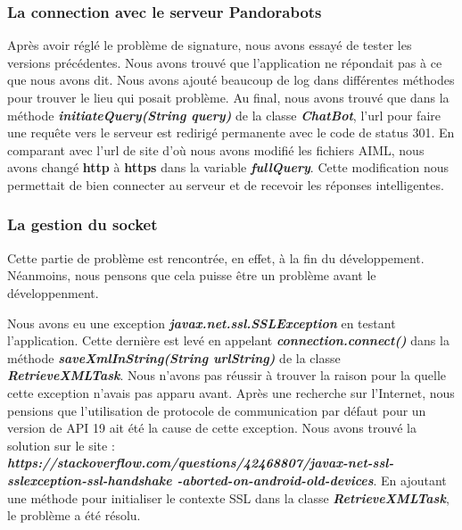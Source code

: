 \subsubsection{La connection avec le serveur Pandorabots}

\indent Après avoir réglé le problème de signature, nous avons essayé de tester les versions précédentes. Nous avons trouvé que l'application ne répondait pas à ce que nous avons dit. Nous avons ajouté beaucoup de log dans différentes méthodes pour trouver le lieu qui posait problème. Au final, nous avons trouvé que dans la méthode \textbf{\emph{initiateQuery(String query)}} de la classe \textbf{\emph{ChatBot}}, l'url pour faire une requête vers le serveur est redirigé permanente avec le code de status 301. En comparant avec l'url de site d'où nous avons modifié les fichiers AIML, nous avons changé \textbf{http} à \textbf{https} dans la variable \textbf{\emph{fullQuery}}. Cette modification nous permettait de bien connecter au serveur et de recevoir les réponses intelligentes.

\subsubsection{La gestion du socket}

\indent Cette partie de problème est rencontrée, en effet, à la fin du développement. Néanmoins, nous pensons que cela puisse être un problème avant le développenment.

\indent Nous avons eu une exception \textbf{\emph{javax.net.ssl.SSLException}} en testant l'application. Cette dernière est levé en appelant \textbf{\emph{connection.connect()}} dans la méthode \textbf{\emph{saveXmlInString(String urlString)}} de la classe \textbf{\emph{RetrieveXMLTask}}. Nous n'avons pas réussir à trouver la raison pour la quelle cette exception n'avais pas apparu avant. Après une recherche sur l'Internet, nous pensions que l'utilisation de protocole de communication par défaut pour un version de API 19 ait été la cause de cette exception. Nous avons trouvé la solution sur le site : \textbf{\emph{https://stackoverflow.com/questions/42468807/javax-net-ssl-sslexception-ssl-handshake -aborted-on-android-old-devices}}. En ajoutant une méthode pour initialiser le contexte SSL dans la classe \textbf{\emph{RetrieveXMLTask}}, le problème a été résolu.

\newpage

